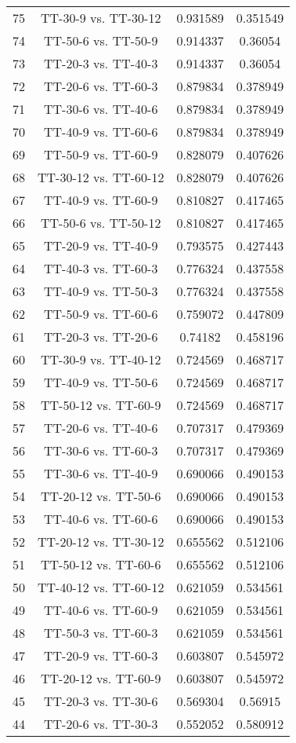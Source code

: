 \documentclass[a4paper,10pt]{article}
\begin{document}
\begin{landscape}
\begin{table}[!htp]
\begin{tabular}{cccc}
75&TT-30-9 vs. TT-30-12&0.931589&0.351549\\
74&TT-50-6 vs. TT-50-9&0.914337&0.36054\\
73&TT-20-3 vs. TT-40-3&0.914337&0.36054\\
72&TT-20-6 vs. TT-60-3&0.879834&0.378949\\
71&TT-30-6 vs. TT-40-6&0.879834&0.378949\\
70&TT-40-9 vs. TT-60-6&0.879834&0.378949\\
69&TT-50-9 vs. TT-60-9&0.828079&0.407626\\
68&TT-30-12 vs. TT-60-12&0.828079&0.407626\\
67&TT-40-9 vs. TT-60-9&0.810827&0.417465\\
66&TT-50-6 vs. TT-50-12&0.810827&0.417465\\
65&TT-20-9 vs. TT-40-9&0.793575&0.427443\\
64&TT-40-3 vs. TT-60-3&0.776324&0.437558\\
63&TT-40-9 vs. TT-50-3&0.776324&0.437558\\
62&TT-50-9 vs. TT-60-6&0.759072&0.447809\\
61&TT-20-3 vs. TT-20-6&0.74182&0.458196\\
60&TT-30-9 vs. TT-40-12&0.724569&0.468717\\
59&TT-40-9 vs. TT-50-6&0.724569&0.468717\\
58&TT-50-12 vs. TT-60-9&0.724569&0.468717\\
57&TT-20-6 vs. TT-40-6&0.707317&0.479369\\
56&TT-30-6 vs. TT-60-3&0.707317&0.479369\\
55&TT-30-6 vs. TT-40-9&0.690066&0.490153\\
54&TT-20-12 vs. TT-50-6&0.690066&0.490153\\
53&TT-40-6 vs. TT-60-6&0.690066&0.490153\\
52&TT-20-12 vs. TT-30-12&0.655562&0.512106\\
51&TT-50-12 vs. TT-60-6&0.655562&0.512106\\
50&TT-40-12 vs. TT-60-12&0.621059&0.534561\\
49&TT-40-6 vs. TT-60-9&0.621059&0.534561\\
48&TT-50-3 vs. TT-60-3&0.621059&0.534561\\
47&TT-20-9 vs. TT-60-3&0.603807&0.545972\\
46&TT-20-12 vs. TT-60-9&0.603807&0.545972\\
45&TT-20-3 vs. TT-30-6&0.569304&0.56915\\
44&TT-20-6 vs. TT-30-3&0.552052&0.580912\\

\end{tabular}
\end{table}
\end{landscape}
\end{document}
